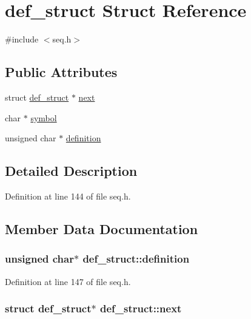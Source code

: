 \hypertarget{structdef__struct}{}\section{def\+\_\+struct Struct Reference}
\label{structdef__struct}


{\ttfamily \#include $<$seq.\+h$>$}

\subsection*{Public Attributes}
\begin{DoxyCompactItemize}
\item 
struct \hyperlink{structdef__struct}{def\+\_\+struct} $\ast$ \hyperlink{structdef__struct_a3d927eac2844bd68a3d252528f6c7808}{next}
\item 
char $\ast$ \hyperlink{structdef__struct_a1e3dda443ba48aa800b809866f0b2e24}{symbol}
\item 
unsigned char $\ast$ \hyperlink{structdef__struct_a4e1380e8b6ea725fb31c9d11cde5aff0}{definition}
\end{DoxyCompactItemize}


\subsection{Detailed Description}


Definition at line 144 of file seq.\+h.



\subsection{Member Data Documentation}
\subsubsection[{\texorpdfstring{definition}{definition}}]{\setlength{\rightskip}{0pt plus 5cm}unsigned char$\ast$ def\+\_\+struct\+::definition}\hypertarget{structdef__struct_a4e1380e8b6ea725fb31c9d11cde5aff0}{}\label{structdef__struct_a4e1380e8b6ea725fb31c9d11cde5aff0}


Definition at line 147 of file seq.\+h.

\subsubsection[{\texorpdfstring{next}{next}}]{\setlength{\rightskip}{0pt plus 5cm}struct {\bf def\+\_\+struct}$\ast$ def\+\_\+struct\+::next}\hypertarget{structdef__struct_a3d927eac2844bd68a3d252528f6c7808}{}\label{structdef__struct_a3d927eac2844bd68a3d252528f6c7808}


